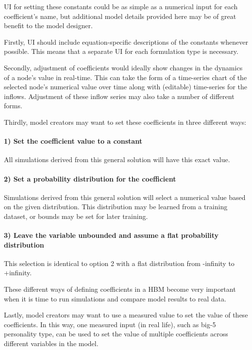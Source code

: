 \documentclass[conference]{IEEEtran}
\begin{document}
UI for setting these constants could be as simple as a numerical input for each coefficient's name, but additional model details provided here may be of great benefit to the model designer. 

Firstly, UI should include equation-specific descriptions of the constants whenever possible. This means that a separate UI for each formulation type is necessary. 

Secondly, adjustment of coefficients would ideally show changes in the dynamics of a node's value in real-time. 
This can take the form of a time-series chart of the selected node's numerical value over time along with (editable) time-series for the inflows. 
Adjustment of these inflow series may also take a number of different forms. 

Thirdly, model creators may want to set these coefficients in three different ways: 
\paragraph{1) Set the coefficient value to a constant}
All simulations derived from this general solution will have this exact value.

\paragraph{2) Set a probability distribution for the coefficient}
Simulations derived from this general solution will select a numerical value based on the given distribution. 
This distribution may be learned from a training dataset, or bounds may be set for later training. 

\paragraph{3) Leave the variable unbounded and assume a flat probability distribution}
This selection is identical to option 2 with a flat distribution from -infinity to +infinity.


These different ways of defining coefficients in a HBM become very important when it is time to run simulations and compare model results to real data. 

Lastly, model creators may want to use a measured value to set the value of these coefficients. In this way, one measured input (in real life), such as big-5 personality type, can be used to set the value of multiple coefficients across different variables in the model.
\end{document}
